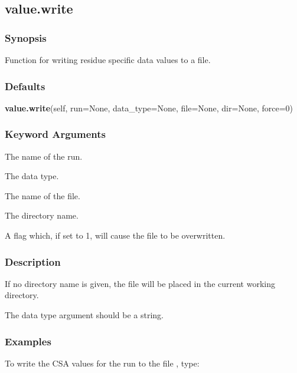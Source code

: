 \newpage

\subsection{value.write}


\subsubsection{Synopsis}

Function for writing residue specific data values to a file.



\subsubsection{Defaults}

\textsf{\textbf{value.write}(self, run=None, data\_type=None, file=None, dir=None, force=0)}


\subsubsection{Keyword Arguments}

  The name of the run. 

  The data type. 

  The name of the file. 

  The directory name. 

  A flag which, if set to 1, will cause the file to be overwritten. 




\subsubsection{Description}

If no directory name is given, the file will be placed in the current working directory.


The data type argument should be a string.



\subsubsection{Examples}

To write the CSA values for the run  to the file , type:




